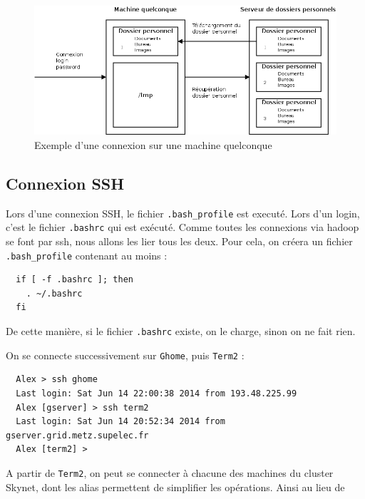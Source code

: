 \begin{figure}[h!]
  \centering
  \includegraphics[width=16cm]{images/connexion_supelec.png}
  \caption{Exemple d'une connexion sur une machine quelconque}
  \label{fig:connexion_supelec}
\end{figure}

\subsection{Connexion SSH}
\label{sec:connexion-ssh}

\par Lors d'une connexion SSH, le fichier \texttt{.bash\_profile} est executé. Lors d'un login, c'est le fichier \texttt{.bashrc} qui est exécuté. Comme toutes les connexions via hadoop se font par ssh, nous allons les lier tous les deux. Pour cela, on créera un fichier \texttt{.bash\_profile} contenant au moins :

\begin{verbatim}
  if [ -f .bashrc ]; then
    . ~/.bashrc
  fi
\end{verbatim}

\par De cette manière, si le fichier \texttt{.bashrc} existe, on le charge, sinon on ne fait rien.
\par On se connecte successivement sur \texttt{Ghome}, puis \texttt{Term2} :
\begin{verbatim}
  Alex > ssh ghome
  Last login: Sat Jun 14 22:00:38 2014 from 193.48.225.99
  Alex [gserver] > ssh term2
  Last login: Sat Jun 14 20:52:34 2014 from gserver.grid.metz.supelec.fr
  Alex [term2] > 
\end{verbatim}

\par A partir de \texttt{Term2}, on peut se connecter à chacune des machines du cluster Skynet, dont les alias permettent de simplifier les opérations. Ainsi au lieu de 

